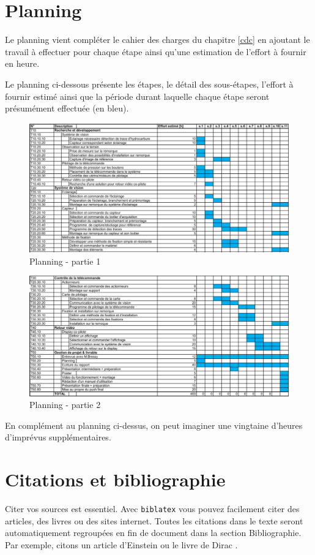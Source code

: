 \section{Planning}
Le planning vient compléter le cahier des charges du chapitre \ref{cdc} en ajoutant le travail à effectuer pour chaque étape ainsi qu'une estimation
de l'effort à fournir en heure.

Le planning ci-dessous présente les étapes, le détail des sous-étapes, l'effort à fournir estimé ainsi que la période durant laquelle chaque étape seront présumément effectuée (en bleu).
\begin{figure}[H]
    \centering
    \includegraphics[width=15cm, angle=90]{assets/figures/planning1.png}
    \caption{Planning - partie 1}
\end{figure}
\newpage
\begin{figure}[H]
    \centering
    \includegraphics[width=15cm, angle=90]{assets/figures/planning2.png}
    \caption{Planning - partie 2}
\end{figure}

En complément au planning ci-dessus, on peut imaginer une vingtaine d'heures d'imprévus supplémentaires.
\iffalse
    \section{Citations et bibliographie}
    Citer vos sources est essentiel. Avec \texttt{biblatex} vous pouvez facilement citer des articles, des livres ou des sites internet. Toutes les citations dans le texte seront automatiquement regroupées en fin de document dans la section \guillemotleft Bibliographie\guillemotright. Par exemple, citons un article d'Einstein \cite{einstein} ou le livre de Dirac \cite{dirac}.
    
